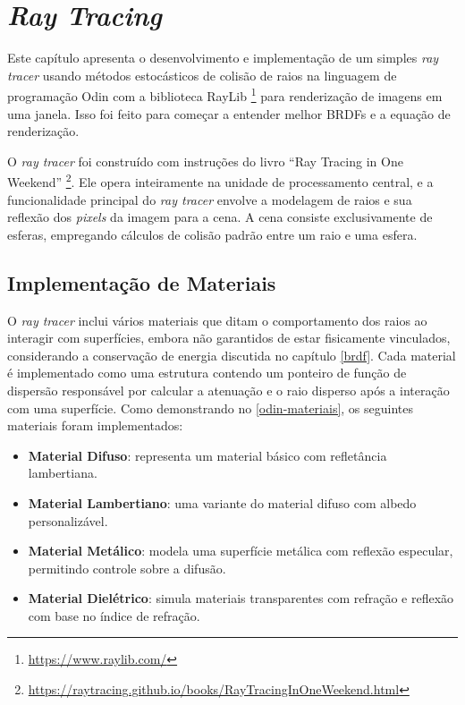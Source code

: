 \documentclass[english, 
               brazil, 
               bsc] %
               {dcomp-abntex2}
\begin{document}
\section{\textit{Ray Tracing} } \label{raytracer}


Este capítulo apresenta o desenvolvimento e implementação de um simples \textit{ray tracer} usando métodos estocásticos de colisão de raios na linguagem de programação Odin com a biblioteca RayLib \footnote{\url{https://www.raylib.com/}} para renderização de imagens em uma janela. Isso foi feito para começar a entender melhor BRDFs e a equação de renderização.

O \textit{ray tracer} foi construído com instruções do livro ``Ray Tracing in One Weekend'' \footnote{\url{https://raytracing.github.io/books/RayTracingInOneWeekend.html}}. Ele opera inteiramente na unidade de processamento central, e a funcionalidade principal do \textit{ray tracer} envolve a modelagem de raios e sua reflexão dos \textit{pixels} da imagem para a cena. A cena consiste exclusivamente de esferas, empregando cálculos de colisão padrão entre um raio e uma esfera.
\subsection{Implementação de Materiais}

O \textit{ray tracer} inclui vários materiais que ditam o comportamento dos raios ao interagir com superfícies, embora não garantidos de estar fisicamente vinculados, considerando a conservação de energia discutida no capítulo \ref{brdf}. Cada material é implementado como uma estrutura contendo um ponteiro de função de dispersão responsável por calcular a atenuação e o raio disperso após a interação com uma superfície. Como demonstrando no \autoref{odin-materiais}, os seguintes materiais foram implementados:

\begin{itemize}
\item \textbf{Material Difuso}: representa um material básico com refletância lambertiana.
\item \textbf{Material Lambertiano}: uma variante do material difuso com albedo personalizável.
\item \textbf{Material Metálico}: modela uma superfície metálica com reflexão especular, permitindo controle sobre a difusão.
\item \textbf{Material Dielétrico}: simula materiais transparentes com refração e reflexão com base no índice de refração.
\end{itemize}
\end{document}
